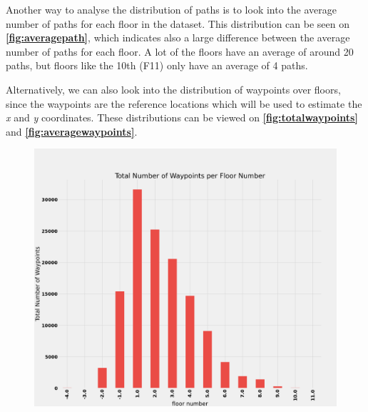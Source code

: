 Another way to analyse the distribution of paths is to look into the average number of paths for each floor in the dataset. This distribution can be seen on \textbf{\autoref{fig:averagepath}}, which indicates also a large difference between the average number of paths for each floor. A lot of the floors have an average of around 20 paths, but floors like the 10th (F11) only have an average of 4 paths.

Alternatively, we can also look into the distribution of waypoints over floors, since the waypoints are the reference locations which will be used to estimate the \textit{x} and \textit{y} coordinates. These distributions can be viewed on \textbf{\autoref{fig:totalwaypoints}} and \textbf{\autoref{fig:averagewaypoints}}.


\begin{figure}[ht]
    \centering
    \begin{minipage}{.45\textwidth}
    \centering
    \includegraphics[width=.9\textwidth]{Images/ProblemAnalysis/datadistribution4.png}
    \label{fig:totalwaypoints}
    \end{minipage}
    \hspace{0.2cm}
    \begin{minipage}{.45\textwidth}
    \centering

\end{minipage}
\end{figure}
